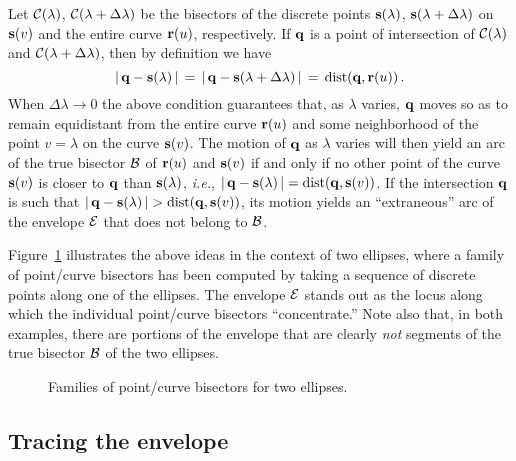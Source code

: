 Let ${\cal C}(\lambda)$, ${\cal C}(\lambda+\Delta\lambda)$
be the bisectors of the discrete points ${\bf s}(\lambda)$,
${\bf s}(\lambda+\Delta\lambda)$ on ${\bf s}(v)$ and the entire
curve ${\bf r}(u)$, respectively. If ${\bf q}$ is a point
of intersection of ${\cal C}(\lambda)$ and ${\cal C}(\lambda+
\Delta\lambda)$, then by definition we have
\begin{equation}
|\,{\bf q}-{\bf s}(\lambda)\,| \,=\,
|\,{\bf q}-{\bf s}(\lambda+\Delta\lambda)\,| \,=\,
{\rm dist}({\bf q},{\bf r}(u)) \,.
\end{equation}
When $\Delta\lambda \to 0$ the above condition guarantees that,
as $\lambda$ varies, ${\bf q}$ moves so as to remain equidistant
from the entire curve ${\bf r}(u)$ and some neighborhood of
the point $v=\lambda$ on the curve ${\bf s}(v)$. The motion of
${\bf q}$ as $\lambda$ varies will then yield an arc of the true
bisector ${\cal B}$ of ${\bf r}(u)$ and ${\bf s}(v)$ if and
only if no other point of the curve ${\bf s}(v)$ is closer to
${\bf q}$ than ${\bf s}(\lambda)$, {\it i.e.}, $|\,{\bf q}-
{\bf s}(\lambda)\,|={\rm dist}({\bf q},{\bf s}(v))$. If the
intersection ${\bf q}$ is such that $|\,{\bf q}-{\bf s}(\lambda)
\,|>{\rm dist}({\bf q},{\bf s}(v))$, its motion yields an
``extraneous'' arc of the envelope ${\cal E}$ that does not
belong to ${\cal B}$.
\QED

Figure~\ref{fig:envelopes} illustrates the above ideas in
the context of two ellipses, where a family of point/curve
bisectors has been computed by taking a sequence of discrete
points along one of the ellipses. The envelope ${\cal E}$ stands
out as the locus along which the individual point/curve bisectors
``concentrate.'' Note also that, in both examples, there are
portions of the envelope that are clearly {\it not\/} segments
of the true bisector ${\cal B}$ of the two ellipses.

\begin{figure}[htbp] \vspace{7.2in}
\caption[]{Families of point/curve bisectors for two ellipses.}
\label{fig:envelopes} \end{figure}

\subsection{Tracing the envelope}

